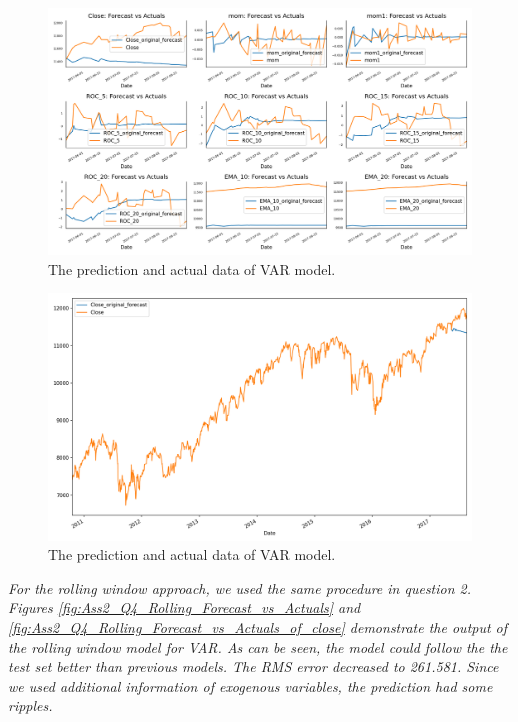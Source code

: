 \begin{figure}[H]
    \centering
    \begin{minipage}[b]{1\textwidth}
        \includegraphics[width=\textwidth]{manuscript/src/figures/Ass2/Ass2_Q4_Forecast_vs_Actuals.png}
    \end{minipage}
    \caption{The prediction and actual data of VAR model.}
    \label{fig:Ass2_Q4_Forecast_vs_Actuals}
\end{figure}

\begin{figure}[H]
    \centering
    \begin{minipage}[b]{1\textwidth}
        \includegraphics[width=\textwidth]{manuscript/src/figures/Ass2/Ass2_Q4_Forecast_vs_Actuals_of_close.png}
    \end{minipage}
    \caption{The prediction and actual data of VAR model.}
    \label{fig:Ass2_Q4_Forecast_vs_Actuals_of_close}
\end{figure}




\textit{For the rolling window approach, we used the same procedure in question 2. Figures \ref{fig:Ass2_Q4_Rolling_Forecast_vs_Actuals} and \ref{fig:Ass2_Q4_Rolling_Forecast_vs_Actuals_of_close} demonstrate the output of the rolling window model for VAR. As can be seen, the model could follow the the test set better than previous models. The RMS error decreased to 261.581. Since we used additional information of exogenous variables, the prediction had some ripples.}


